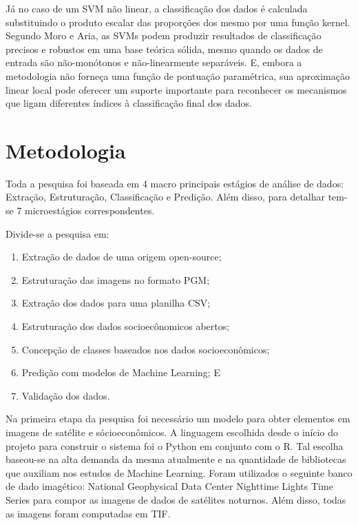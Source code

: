 \documentclass[]{article}
\begin{document}
Já no caso de um SVM não linear, a classificação dos dados é calculada substituindo o produto escalar das proporções dos mesmo por uma função kernel\cite{ref_moro}. Segundo Moro e Aria, as SVMs podem produzir resultados de classificação precisos e robustos em uma base teórica sólida, mesmo quando os dados de entrada são não-monótonos e não-linearmente separáveis. E, embora a metodologia não forneça uma função de pontuação paramétrica, sua aproximação linear local pode oferecer um suporte importante para reconhecer os mecanismos que ligam diferentes índices à classificação final dos dados.

\pagebreak

\section{Metodologia}
\label{s.metodologia}
Toda a pesquisa foi baseada em 4 macro principais estágios de análise de dados: Extração, Estruturação, Classificação e Predição. Além disso, para detalhar tem-se 7 microestágios correspondentes.

Divide-se a pesquisa em:
\begin{enumerate}
	
	\item Extração de dados de uma origem open-source;
	
	\item Estruturação das imagens no formato PGM;
	
	\item Extração dos dados para uma planilha CSV;
	
	\item Estruturação dos dados socioecônomicos abertos;
	
	\item Concepção de classes baseados nos dados socioeconômicos;
	
	\item Predição com modelos de Machine Learning; E
	
	\item Validação dos dados.
	
\end{enumerate}

Na primeira etapa da pesquisa foi necessário um modelo para obter elementos em imagens de satélite e sócioeconômicos. A linguagem escolhida desde o início do projeto para construir o sistema foi o Python em conjunto com o R. Tal escolha baseou-se na alta demanda da mesma atualmente e na quantidade de bibliotecas que auxiliam nos estudos de Machine Learning. Foram utilizados o seguinte banco de dado imagético: National Geophysical Data Center Nighttime Lights Time Series para compor as imagens de dados de satélites noturnos. Além disso, todas as imagens foram computadas em TIF.
\end{document}
